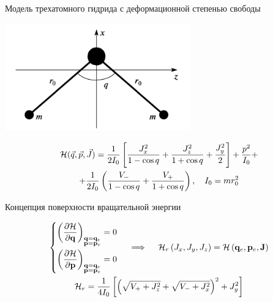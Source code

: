 \documentclass[hyperref={pdfpagelabels=false},usepdftitle=false, xcolor = dvipsnames]{beamer}
\begin{document}
\begin{frame}{Модель трехатомного гидрида с деформационной степенью свободы}
  \begin{block}{}
	\begin{center}
	  \includegraphics[width=0.6\textwidth]{../pictures/triatomic_fixed.png}
	\end{center}

	\vspace*{-1cm}
	\begin{gather}
	  \mathcal{H}(\vec{q}, \vec{p}, \vec{J}) = \frac{1}{2I_0} \left[ \frac{J_x^2}{1-\cos q} + \frac{J_z^2}{1 + \cos q} + \frac{J_y^2}{2} \right] + \frac{p^2}{I_0} + \notag \\
	  + \frac{1}{2I_0} \left( \frac{V_{-}}{1 - \cos q} + \frac{V_{+}}{1 + \cos q} \right), \quad I_0 = m r_0^2 \notag
	\end{gather}
  \end{block}
\end{frame}

\begin{frame}{Концепция поверхности вращательной энергии}
  \begin{varblock}[11cm]{}
	\begin{gather}
	  \left\{
	  \begin{aligned}
	    \left( \frac{\partial \mathcal{H}}{\partial \mathbf{q}} \right)_{\substack{\mathbf{q} = \mathbf{q}_e \\ \mathbf{p} = \mathbf{p}_e}} = 0 \\
		 \left( \frac{\partial \mathcal{H}}{\partial \mathbf{p}} \right)_{\substack{\mathbf{q} = \mathbf{q}_e \\ \mathbf{p} = \mathbf{p}_e}} = 0	     
	  \end{aligned}
	  \right.
	  \quad \implies \quad
	  \mathcal{H}_r \left( J_x, J_y, J_z \right) = \mathcal{H} \left( \mathbf{q}_e, \mathbf{p}_e, \mathbf{J} \right)
	  \notag \\
	  \mathcal{H}_r = \frac{1}{4I_0} \left[ \left( \sqrt{V_{+} + J_z^2} + \sqrt{V_{-} + J_x^2} \right)^2 + J_y^2 \right] \notag
	  \end{gather}
  \end{varblock}
  
\end{frame}
\end{document}
